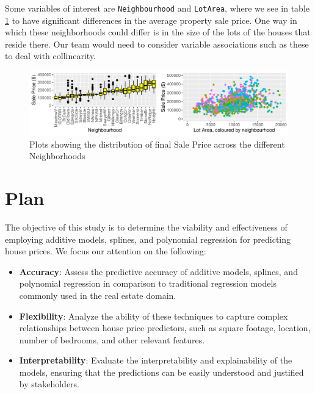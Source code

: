 \documentclass[aoas]{imsart}
\numberwithin{equation}{section}
\theoremstyle{plain}
\theoremstyle{remark}
\begin{document}
Some variables of interest are \texttt{Neighbourhood} and
\texttt{LotArea}, where we see in table \ref{neighbourhood} to have
significant differences in the average property sale price. One way in
which these neighborhoods could differ is in the size of the lots of the
houses that reside there. Our team would need to consider variable
associations such as these to deal with collinearity.

\begin{figure}
\centering
\includegraphics{STAT-444-FINAL-PROJECT-PROPOSAL_files/figure-latex/unnamed-chunk-4-1.pdf}
\caption{Plots showing the distribution of final Sale Price across the
different Neighborhoods\label{neighbourhood}}
\end{figure}

\hypertarget{plan}{%
\section{Plan}\label{plan}}

The objective of this study is to determine the viability and
effectiveness of employing additive models, splines, and polynomial
regression for predicting house prices. We focus our attention on the
following:

\begin{itemize}
\item
  \textbf{Accuracy}: Assess the predictive accuracy of additive models,
  splines, and polynomial regression in comparison to traditional
  regression models commonly used in the real estate domain.
    \vspace{0.2cm}
\item
  \textbf{Flexibility}: Analyze the ability of these techniques to
  capture complex relationships between house price predictors, such as
  square footage, location, number of bedrooms, and other relevant
  features.
  \vspace{0.2cm}
\item
  \textbf{Interpretability}: Evaluate the interpretability and
  explainability of the models, ensuring that the predictions can be
  easily understood and justified by stakeholders.
  \vspace{0.2cm}
\end{itemize}
\end{document}
